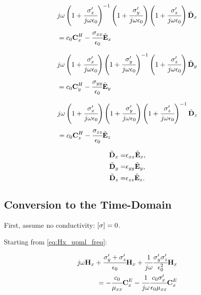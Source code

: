 \begin{eqnarray}
    &j\omega\pare{1 + \cfrac{\sigma_x\Prime}{j\omega\epsilon_0}}\inverse \pare{1 + \cfrac{\sigma_y\Prime}{j\omega\epsilon_0}}\pare{1 + \cfrac{\sigma_z\Prime}{j\omega\epsilon_0}} \Dnw_x \nonumber \\
    &= c_0\CHxw - \cfrac{\sigma_{xx}}{\epsilon_0}\Enw_x
    \label{eq:Ex_upml_freq}
\end{eqnarray}

\begin{eqnarray}
    &j\omega\pare{1 + \cfrac{\sigma_x\Prime}{j\omega\epsilon_0}} \pare{1 + \cfrac{\sigma_y\Prime}{j\omega\epsilon_0}}\inverse \pare{1 + \cfrac{\sigma_z\Prime}{j\omega\epsilon_0}} \Dnw_y \nonumber \\
    &= c_0\CHyw - \cfrac{\sigma_{yy}}{\epsilon_0}\Enw_y
    \label{eq:Ey_upml_freq}
\end{eqnarray}

\begin{eqnarray}
    &j\omega\pare{1 + \cfrac{\sigma_x\Prime}{j\omega\epsilon_0}} \pare{1 + \cfrac{\sigma_y\Prime}{j\omega\epsilon_0}} \pare{1 + \cfrac{\sigma_z\Prime}{j\omega\epsilon_0}}\inverse \Dnw_z \nonumber \\
    &= c_0\CHzw - \cfrac{\sigma_{zz}}{\epsilon_0}\Enw_z
    \label{eq:Ez_upml_freq}
\end{eqnarray}

\begin{eqnarray}
    \tilde{\textbf{D}}_x =& \epsilon_{xx} \tilde{\textbf{E}}_x, \\
    \tilde{\textbf{D}}_y =& \epsilon_{yy} \tilde{\textbf{E}}_y, \\
    \tilde{\textbf{D}}_z =& \epsilon_{zz} \tilde{\textbf{E}}_z. 
\end{eqnarray}

\subsection{Conversion to the Time-Domain}
First, assume no conductivity: $\brackets{\sigma} = 0$.

Starting from \eqref{eq:Hx_upml_freq}:


\begin{eqnarray}
    j\omega \textbf{H}_x + \cfrac{\sigma_y^{\prime} + \sigma_z^{\prime}}{\epsilon_0}\textbf{H}_x + \cfrac{1}{j\omega}\cfrac{\sigma_y^{\prime}\sigma_z^{\prime}}{\epsilon_0^2}\textbf{H}_x \nonumber \\
    = -\cfrac{c_0}{\mu_{xx}}\textbf{C}_x^E - \cfrac{1}{j\omega}\cfrac{c_0\sigma_x^{\prime}}{\epsilon_0\mu_{xx}}\textbf{C}_x^E
\end{eqnarray}

